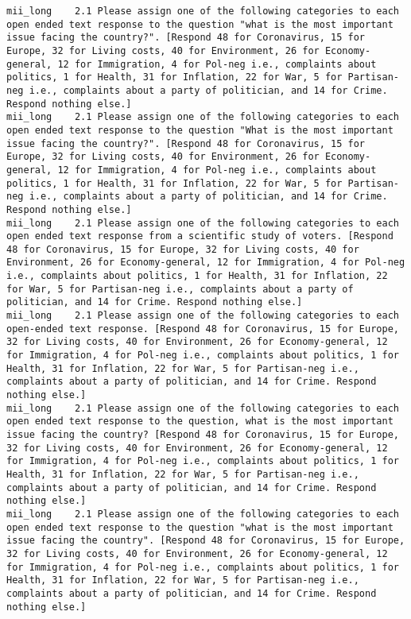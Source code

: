 \begin{lstlisting}[label=lst:promptvariants]
mii_long	2.1	Please assign one of the following categories to each open ended text response to the question "what is the most important issue facing the country?". [Respond 48 for Coronavirus, 15 for Europe, 32 for Living costs, 40 for Environment, 26 for Economy-general, 12 for Immigration, 4 for Pol-neg i.e., complaints about politics, 1 for Health, 31 for Inflation, 22 for War, 5 for Partisan-neg i.e., complaints about a party of politician, and 14 for Crime. Respond nothing else.]
mii_long	2.1	Please assign one of the following categories to each open ended text response to the question "What is the most important issue facing the country?". [Respond 48 for Coronavirus, 15 for Europe, 32 for Living costs, 40 for Environment, 26 for Economy-general, 12 for Immigration, 4 for Pol-neg i.e., complaints about politics, 1 for Health, 31 for Inflation, 22 for War, 5 for Partisan-neg i.e., complaints about a party of politician, and 14 for Crime. Respond nothing else.]
mii_long	2.1	Please assign one of the following categories to each open ended text response from a scientific study of voters. [Respond 48 for Coronavirus, 15 for Europe, 32 for Living costs, 40 for Environment, 26 for Economy-general, 12 for Immigration, 4 for Pol-neg i.e., complaints about politics, 1 for Health, 31 for Inflation, 22 for War, 5 for Partisan-neg i.e., complaints about a party of politician, and 14 for Crime. Respond nothing else.]
mii_long	2.1	Please assign one of the following categories to each open-ended text response. [Respond 48 for Coronavirus, 15 for Europe, 32 for Living costs, 40 for Environment, 26 for Economy-general, 12 for Immigration, 4 for Pol-neg i.e., complaints about politics, 1 for Health, 31 for Inflation, 22 for War, 5 for Partisan-neg i.e., complaints about a party of politician, and 14 for Crime. Respond nothing else.]
mii_long	2.1	Please assign one of the following categories to each open ended text response to the question, what is the most important issue facing the country? [Respond 48 for Coronavirus, 15 for Europe, 32 for Living costs, 40 for Environment, 26 for Economy-general, 12 for Immigration, 4 for Pol-neg i.e., complaints about politics, 1 for Health, 31 for Inflation, 22 for War, 5 for Partisan-neg i.e., complaints about a party of politician, and 14 for Crime. Respond nothing else.]
mii_long	2.1	Please assign one of the following categories to each open ended text response to the question "what is the most important issue facing the country". [Respond 48 for Coronavirus, 15 for Europe, 32 for Living costs, 40 for Environment, 26 for Economy-general, 12 for Immigration, 4 for Pol-neg i.e., complaints about politics, 1 for Health, 31 for Inflation, 22 for War, 5 for Partisan-neg i.e., complaints about a party of politician, and 14 for Crime. Respond nothing else.]

\end{lstlisting}
